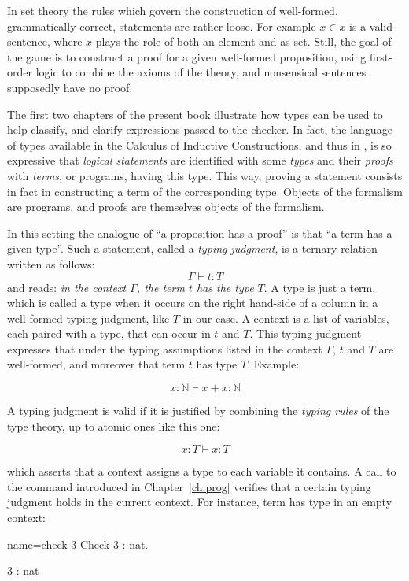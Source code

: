 In set theory the rules which govern the construction of
well-formed, grammatically correct, statements are rather loose.
For example
$x \in x$ is a valid sentence, where $x$ plays the role of
both an element and as set. Still, the
goal of the game is to construct a proof for a given well-formed
proposition, using first-order logic to combine the axioms of the
theory, and nonsensical sentences supposedly have no proof.

The first two chapters of the present book illustrate how
types can be used to help classify, and clarify expressions passed to
the checker. In fact, the language of types available in the Calculus
of Inductive Constructions, and thus in  \Coq{}, is so expressive that
\emph{logical statements} are identified with some \emph{types} and
their \emph{proofs} with \emph{terms}, or programs, having this
type. This way, proving a statement consists in fact in constructing a
term of the corresponding type. Objects of the formalism are programs,
and proofs are themselves objects of the formalism.

In this setting the analogue of ``a proposition has a proof''
is that ``a term has a given type''. Such a statement, called a
\emph{typing judgment}, is a ternary relation written as follows:
$$\Gamma \vdash t : T$$
and reads:
\emph{in the context $\Gamma$, the term $t$ has the type $T$}. A type
is just a term, which is called a type when it occurs on the right
hand-side of a column in a well-formed typing judgment, like $T$ in
our case. A context is a list of variables, each paired with a type,
that can occur in $t$ and $T$. This typing judgment expresses that
under the typing assumptions listed in the context $\Gamma$, $t$ and
$T$ are well-formed, and moreover that term $t$ has type $T$. Example:

$$x : \mathbb{N} \vdash x + x : \mathbb{N}$$

A typing judgment is valid if it is justified by combining the \emph{typing rules} of the
type theory, up to atomic ones like this one:

$$x : T \vdash x : T$$

which asserts that a context assigns a type to each variable it contains.
A call to the  command introduced in Chapter~\ref{ch:prog} 
verifies that a certain typing judgment holds in the current
context. For instance, term  has type  in an empty context:

\begin{coq-left}{name=check-3}{}
Check 3 : nat.
\end{coq-left}
\begin{coqout-right}
3 : nat
\end{coqout-right}

